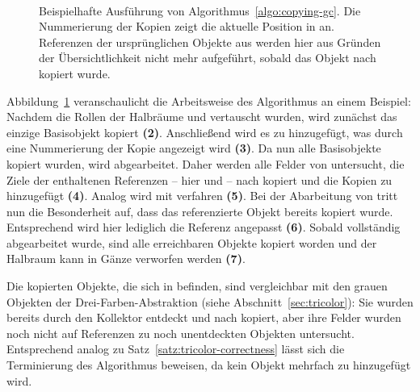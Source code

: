 \begin{figure}[h]
	\centering
	\\[1cm]
	\\[1cm]
	\\[1cm]
	\\[1cm]
	\\[1cm]
	\\[1cm]
	
	\caption[Ausführung der kopierenden Garbage Collection]{Beispielhafte Ausführung von Algorithmus~\ref{algo:copying-gc}. Die Nummerierung der Kopien zeigt die aktuelle Position in  an. Referenzen der ursprünglichen Objekte aus  werden hier aus Gründen der Übersichtlichkeit nicht mehr aufgeführt, sobald das Objekt nach  kopiert wurde.}
	\label{fig:fenichel-example}
\end{figure}

Abbildung~\ref{fig:fenichel-example} veranschaulicht die Arbeitsweise des Algorithmus an einem Beispiel:
Nachdem die Rollen der Halbräume  und  vertauscht wurden, wird zunächst das einzige Basisobjekt  kopiert \textbf{(2)}.
Anschließend wird es zu  hinzugefügt, was durch eine Nummerierung der Kopie  angezeigt wird \textbf{(3)}.
Da nun alle Basisobjekte kopiert wurden, wird  abgearbeitet.
Daher werden alle Felder von  untersucht, die Ziele der enthaltenen Referenzen -- hier  und  -- nach  kopiert und die Kopien zu  hinzugefügt \textbf{(4)}.
Analog wird mit  verfahren \textbf{(5)}.
Bei der Abarbeitung von  tritt nun die Besonderheit auf, dass das referenzierte Objekt  bereits kopiert wurde.
Entsprechend wird hier lediglich die Referenz angepasst \textbf{(6)}.
Sobald  vollständig abgearbeitet wurde, sind alle erreichbaren Objekte kopiert worden und der Halbraum  kann in Gänze verworfen werden \textbf{(7)}.

Die kopierten Objekte, die sich in  befinden, sind vergleichbar mit den grauen Objekten der Drei-Farben-Abstraktion (siehe Abschnitt~\ref{sec:tricolor}):
Sie wurden bereits durch den Kollektor entdeckt und nach  kopiert, aber ihre Felder wurden noch nicht auf Referenzen zu noch unentdeckten Objekten untersucht.
Entsprechend analog zu Satz~\ref{satz:tricolor-correctness} lässt sich die Terminierung des Algorithmus beweisen, da kein Objekt mehrfach zu  hinzugefügt wird.


